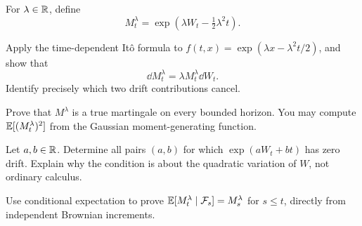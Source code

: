 \begin{exercise}
For \(\lambda\in\mathbb{R}\), define
\[
M_t^{\lambda}=\exp\!\left(\lambda W_t-\tfrac12\lambda^2t\right).
\]
\begin{exparts}
  \item Apply the time-dependent It\^o formula to
  \(f(t,x)=\exp(\lambda x-\lambda^2t/2)\), and show that
  \[\dd M_t^{\lambda}=\lambda M_t^{\lambda}\dd W_t.\]
  Identify precisely which two drift contributions cancel.
  \item Prove that \(M^\lambda\) is a true martingale on every bounded
  horizon. You may compute \(\mathbb E[(M_t^\lambda)^2]\) from the Gaussian
  moment-generating function.
  \item Let \(a,b\in\mathbb{R}\). Determine all pairs \((a,b)\) for which
  \(\exp(aW_t+bt)\) has zero drift. Explain why the condition is about
  the quadratic variation of \(W\), not ordinary calculus.
  \item Use conditional expectation to prove
  \(\mathbb E[M_t^\lambda\mid\mathcal F_s]=M_s^\lambda\) for \(s\leq t\), directly
  from independent Brownian increments.
\end{exparts}
\end{exercise}
\fi
